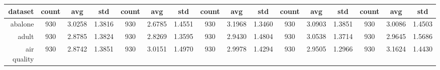 \begin{table}[H]
{\begin{tabular}{rccccccccccccccc}
			\cmidrule{2-16}    \textbf{dataset} & \textbf{count}                      & \textbf{avg}                                                              & \textbf{std}    & \textbf{count}                 & \textbf{avg}                                                                       & \textbf{std}    & \textbf{count}                  & \textbf{avg}                                                              & \textbf{std}    & \textbf{count}                  & \textbf{avg}                                                              & \textbf{std}    & \textbf{count}                  & \textbf{avg}    & \textbf{std}    \\
			\midrule
			abalone                             & 930                                 & 3.0258                                                                    & 1.3816          & 930                            & \cellcolor[rgb]{ .776,  .937,  .808}\textcolor[rgb]{ 0,  .38,  0}{2.6785}          & 1.4551          & 930                             & 3.1968                                                                    & 1.3460          & 930                             & 3.0903                                                                    & 1.3851          & 930                             & 3.0086          & 1.4503          \\
			adult                               & 930                                 & 2.8785                                                                    & 1.3824          & 930                            & \cellcolor[rgb]{ .776,  .937,  .808}\textcolor[rgb]{ 0,  .38,  0}{2.8269}          & 1.3595          & 930                             & 2.9430                                                                    & 1.4804          & 930                             & 3.0538                                                                    & 1.3714          & 930                             & 2.9645          & 1.5686          \\
			air quality                         & 930                                 & \cellcolor[rgb]{ .776,  .937,  .808}\textcolor[rgb]{ 0,  .38,  0}{2.8742} & 1.3851          & 930                            & 3.0151                                                                             & 1.4970          & 930                             & 2.9978                                                                    & 1.4294          & 930                             & 2.9505                                                                    & 1.2966          & 930                             & 3.1624          & 1.4430          \\

\end{tabular}}
\end{table}
